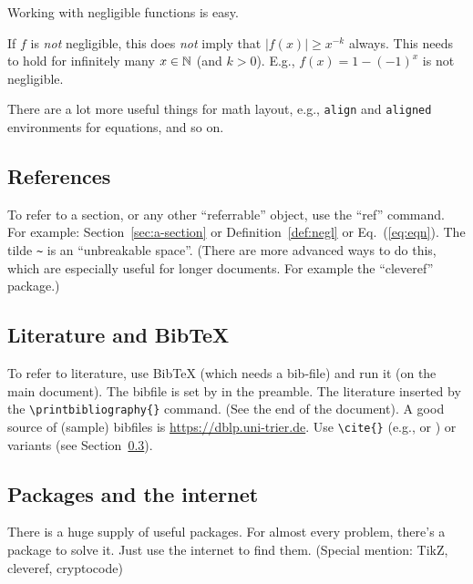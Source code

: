 \documentclass[11pt]{scrartcl}
\begin{document}
\begin{corollary}
	Working with negligible functions is easy.
\end{corollary}

\begin{remark}
	If $f$ is \emph{not} negligible,
	this does \emph{not} imply that $|f(x)| \geq x^{-k}$ always.
	This needs to hold for infinitely many $x \in \mathbb{N}$ (and $k > 0$).
	E.g., $f(x) = 1 - (-1)^x$ is not negligible.
\end{remark}

There are a lot more useful things for math layout,
e.g., \verb|align| and \verb|aligned| environments for equations, and so on.

\subsection{References}
\label{sec:references}

To refer to a section, or any other ``referrable'' object, use the ``ref'' command.
For example: Section~\ref{sec:a-section} or Definition~\ref{def:negl} or Eq.~(\ref{eq:eqn}).
The tilde \verb|~| is an ``unbreakable space''.
(There are more advanced ways to do this, which are especially useful for longer documents.
For example the ``cleveref'' package.)


\subsection{Literature and BibTeX}
\label{subsec:literature}

To refer to literature, use BibTeX (which needs a bib-file) and run it (on the main document).
The bibfile is set by \verb|| in the preamble.
The literature inserted by the \verb|\printbibliography{}| command. (See the end of the document).
A good source of (sample) bibfiles is \url{https://dblp.uni-trier.de}.
Use \verb|\cite{}| (e.g., \cite{DH76} or \cite{RSA78}) or variants (see Section~\ref{subsec:packages}).


\subsection{Packages and the internet}
\label{subsec:packages}

There is a huge supply of useful packages.
For almost every problem, there's a package to solve it.
Just use the internet to find them.
(Special mention: TikZ, cleveref, cryptocode)
\end{document}
